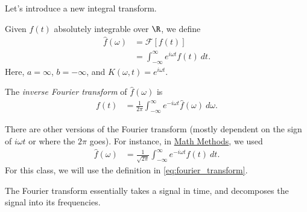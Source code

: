\documentclass[10pt]{mypackage}
\begin{document}
Let's introduce a new integral transform.
\begin{definition}
  Given $f(t)$ absolutely integrable over $\R$, we define
  \begin{align*}
    \hat{f}\left( \omega \right) &= \mathcal{F}\left[ f(t) \right]\\
                                 &= \int_{-\infty}^{\infty} e^{i\omega t}f(t)\:dt.\label{eq:fourier_transform}\tag{$\dag$}
  \end{align*}
  Here, $a = \infty$, $b = -\infty$, and $K\left( \omega,t \right) = e^{i\omega t}$.
\end{definition}
\begin{definition}
  The \textit{inverse Fourier transform} of $\hat{f}\left( \omega \right)$ is
  \begin{align*}
    f(t) &= \frac{1}{2\pi} \int_{-\infty}^{\infty} e^{-i\omega t}\hat{f}\left( \omega \right)\:d\omega.
  \end{align*}
\end{definition}
\begin{remark}
  There are other versions of the Fourier transform (mostly dependent on the sign of $i\omega t$ or where the $2\pi$ goes). For instance, in \href{https://ai.avinash-iyer.com/Classes_and_Homework/College/Y4/Y4S1,\%20Math\%20Methods/math_methods_notes.pdf}{Math Methods}, we used
  \begin{align*}
    \hat{f}\left( \omega \right) &= \frac{1}{\sqrt{2\pi}} \int_{-\infty}^{\infty} e^{-i\omega t}f(t)\:dt.
  \end{align*}
  For this class, we will use the definition in \eqref{eq:fourier_transform}.
\end{remark}
The Fourier transform essentially takes a signal in time, and decomposes the signal into its frequencies.
\end{document}

